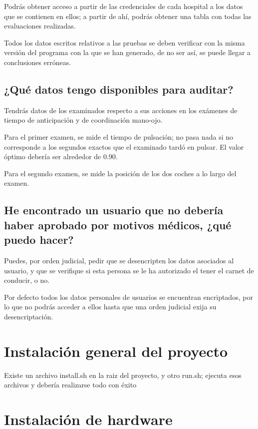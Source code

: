\documentclass[12pt,a4paper,twoside,openright]{book}
\begin{document}
\begin{umaappendices}
Podrás obtener acceso a partir de las credenciales de cada hospital a los datos que se contienen en ellos; a partir de ahí, podrás obtener una tabla con todas las evaluaciones realizadas.

Todos los datos escritos relativos a las pruebas se deben verificar con la misma versión del programa con la que se han generado, de no ser así, se puede llegar a conclusiones erróneas.

\subsection{¿Qué datos tengo disponibles para auditar?}

Tendrás datos de los examinados respecto a sus acciones en los exámenes de tiempo de anticipación y de coordinación mano-ojo.

Para el primer examen, se mide el tiempo de pulsación; no pasa nada si no corresponde a los segundos exactos que el examinado tardó en pulsar. El valor óptimo debería ser alrededor de 0.90.

Para el segundo examen, se mide la posición de los dos coches a lo largo del examen.

\subsection{He encontrado un usuario que no debería haber aprobado por motivos médicos, ¿qué puedo hacer?}

Puedes, por orden judicial, pedir que se desencripten los datos asociados al usuario, y que se verifique si esta persona se le ha autorizado el tener el carnet de conducir, o no.

Por defecto todos los datos personales de usuarios se encuentran encriptados, por lo que no podrás acceder a ellos hasta que una orden judicial exija su desencriptación.


\section{Instalación general del proyecto}

Existe un archivo install.sh en la raiz del proyecto, y otro run.sh; ejecuta esos archivos y debería realizarse todo con éxito

\section{Instalación de hardware}


\end{umaappendices}
\end{document}
